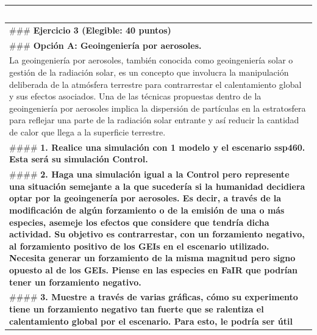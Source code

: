 \documentclass[11pt]{article}
\makeatletter
\newcommand{\boxspacing}{\kern\kvtcb@left@rule\kern\kvtcb@boxsep}
\newcommand{\prompt}[4]{
        {\ttfamily\llap{{\color{#2}[#3]:\hspace{3pt}#4}}\vspace{-\baselineskip}}
    }
\makeatother
\begin{document}
\begin{center}\rule{0.5\linewidth}{0.5pt}\end{center}

    \begin{tcolorbox}[breakable, size=fbox, boxrule=1pt, pad at break*=1mm,colback=cellbackground, colframe=cellborder]
\prompt{In}{incolor}{ }{\boxspacing}
\begin{Verbatim}[commandchars=\\\{\}]

\end{Verbatim}
\end{tcolorbox}

    \begin{longtable}[]{@{}
  >{\raggedright\arraybackslash}p{}@{}}
\toprule
\endhead
\#\#\# \textbf{ Ejercicio 3 (Elegible: 40 puntos) } \\
\#\#\# \textbf{ Opción A: Geoingeniería por aerosoles. } \\
La geoingeniería por aerosoles, también conocida como geoingeniería
solar o gestión de la radiación solar, es un concepto que involucra la
manipulación deliberada de la atmósfera terrestre para contrarrestar el
calentamiento global y sus efectos asociados. Una de las técnicas
propuestas dentro de la geoingeniería por aerosoles implica la
dispersión de partículas en la estratosfera para reflejar una parte de
la radiación solar entrante y así reducir la cantidad de calor que llega
a la superficie terrestre. \\
\#\#\#\# \textbf{ 1. Realice una simulación con 1 modelo y el escenario
ssp460. Esta será su simulación Control. } \\
\#\#\#\# \textbf{ 2. Haga una simulación igual a la Control pero
represente una situación semejante a la que sucedería si la humanidad
decidiera optar por la geoingenería por aerosoles. Es decir, a través de
la modificación de algún forzamiento o de la emisión de una o más
especies, asemeje los efectos que considere que tendría dicha actividad.
Su objetivo es contrarrestar, con un forzamiento negativo, al
forzamiento positivo de los GEIs en el escenario utilizado. Necesita
generar un forzamiento de la misma magnitud pero signo opuesto al de los
GEIs. Piense en las especies en FaIR que podrían tener un forzamiento
negativo. } \\
\#\#\#\# \textbf{ 3. Muestre a través de varias gráficas, cómo su
experimento tiene un forzamiento negativo tan fuerte que se ralentiza el
calentamiento global por el escenario. Para esto, le podría ser útil
}
\end{longtable}
\end{document}
